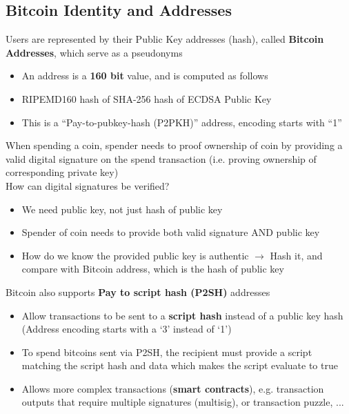 \subsection{Bitcoin Identity and Addresses}
Users are represented by their Public Key addresses (hash), called \textbf{Bitcoin Addresses}, which serve as a pseudonyms
\begin{itemize}
	\item An address is a \textbf{160 bit} value, and is computed as follows
	\item RIPEMD160 hash of SHA-256 hash of ECDSA Public Key
	\item This is a ``Pay-to-pubkey-hash (P2PKH)'' address, encoding starts with ``1''
\end{itemize}
When spending a coin, spender needs to proof ownership of coin by providing a valid digital signature on the spend transaction (i.e. proving ownership of corresponding private key)\\
How can digital signatures be verified?
\begin{itemize}
	\item We need public key, not just hash of public key
	\item Spender of coin needs to provide both valid signature AND public key
	\item How do we know the provided public key is authentic $\rightarrow$ Hash it, and compare with Bitcoin address, which is the hash of public key
\end{itemize}
Bitcoin also supports \textbf{Pay to script hash (P2SH)} addresses
\begin{itemize}
	\item Allow transactions to be sent to a \textbf{script hash} instead of a public key hash (Address encoding starts with a `3' instead of `1')
	\item To spend bitcoins sent via P2SH, the recipient must provide a script matching the script hash and data which makes the script evaluate to true
	\item Allows more complex transactions (\textbf{smart contracts}), e.g. transaction outputs that require multiple signatures (multisig), or transaction puzzle, ...
\end{itemize}
